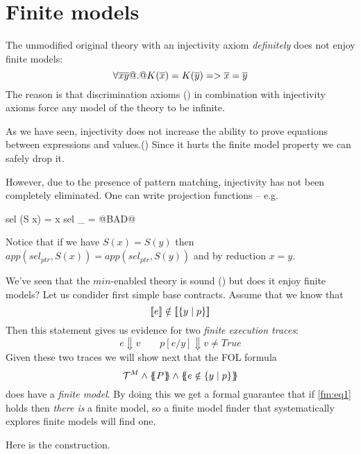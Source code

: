 \documentclass[preprint]{sigplanconf}
\begin{document}
\section{Finite models}\label{sect:fin-mods}
\newcommand{\Univ}{{\cal U}}
\newcommand{\redop}{\longrightarrow^{\star}}

The unmodified original theory with an injectivity axiom {\em definitely} does
not enjoy finite models:
\[   \forall \overline{x}\overline{y} @.@ K(\overline{x}) = K(\overline{y}) => \overline{x} = \overline{y} \]
The reason is that discrimination axioms () in
combination with injectivity axioms force any model of the theory to be infinite.

As we have seen, injectivity does not increase the ability to prove
equations between expressions and values.() Since it
hurts the finite model property we can safely drop it.

However, due to the presence of pattern matching, injectivity has not
been completely eliminated. One can write projection functions -- e.g.
\begin{code}
sel (S x) = x 
sel _     = @BAD@
\end{code}
Notice that if we have $S(x) = S(y)$ then 
$app(sel_{ptr},S(x)) = app(sel_{ptr},S(y))$ and by reduction $x = y$.

We've seen that the $min$-enabled theory is sound () 
but does it enjoy finite models? Let us condider first simple base contracts. 
Assume that we know that
\begin{equation}
  [\![e]\!] \notin [\![\{y \mid p\}]\!] \label{fm:eq1} 
\end{equation}
Then this statement gives us evidence for two {\em finite execution traces}:
\begin{equation}
   e \Downarrow v  \quad\quad p[e/y] \Downarrow v \neq True \label{fm:eq2} 
\end{equation}
Given these two traces we will show next that the FOL formula 
\[ \Th^M \land \ptrans{}{P} \land \ctrans{}{}{e \notin \{ y \mid p \}} \] 
does have a {\em finite model}. By doing this we get a formal guarantee that 
if \ref{fm:eq1} holds then {\em there is} a finite model, so a finite model finder 
that systematically explores finite models will find one.

Here is the construction. 
\end{document}
